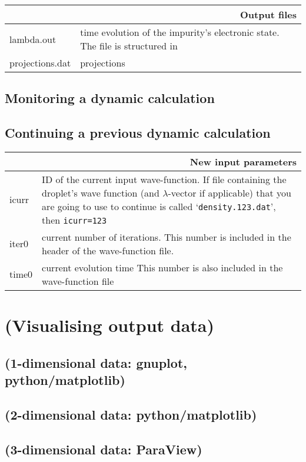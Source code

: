 \documentclass[10pt,a4paper]{article}
\begin{document}
	\begin{center}
		\begin{tabular}{l|p{7.5cm}}
			\multicolumn{2}{r}{\textbf{Output files}} \\
			\hline\hline
			lambda.out	& time evolution of the impurity's electronic state. The file is structured in \\
			projections.dat	& {\color{red}projections}	\\
		\end{tabular}
	\end{center}
	
	\subsection{Monitoring a dynamic calculation}\label{sec:monitor}
	
	\subsection{Continuing a previous dynamic calculation}
	\begin{center}
		\begin{tabular}{l|p{8.0cm}}
			\multicolumn{2}{r}{\textbf{New input parameters}} \\
			\hline\hline
			icurr	& ID of the current input wave-function. If file containing the droplet's wave function (and $\lambda$-vector if applicable) that you are going to use to continue is called `\verb|density.123.dat|', then \verb|icurr=123| \\
			iter0	& current number of iterations. This number is included in the header of the wave-function file. \\
			time0	& current evolution time This number is also included in the wave-function file \\
		\end{tabular}
	\end{center}
	
	\section{{\color{red}(Visualising output data)}}
	\subsection{{\color{red}(1-dimensional data: gnuplot, python/matplotlib)}}
	\subsection{{\color{red}(2-dimensional data: python/matplotlib)}}
	\subsection{{\color{red}(3-dimensional data: ParaView)}}
	
	
\end{document}
